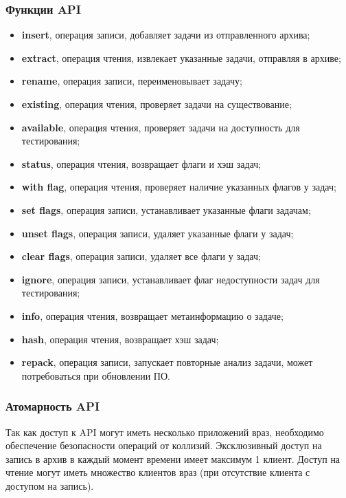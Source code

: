 \subsubsection{Функции API}
\begin{itemize}
    \item \textbf{insert}, операция записи, добавляет задачи из отправленного архива;
    \item \textbf{extract}, операция чтения, извлекает указанные задачи, отправляя в архиве;
    \item \textbf{rename}, операция записи, переименовывает задачу;
    \item \textbf{existing}, операция чтения, проверяет задачи на существование;
    \item \textbf{available}, операция чтения, проверяет задачи на доступность для тестирования;
    \item \textbf{status}, операция чтения, возвращает флаги и хэш задач;
    \item \textbf{with flag}, операция чтения, проверяет наличие указанных флагов у задач;
    \item \textbf{set flags}, операция записи, устанавливает указанные флаги задачам;
    \item \textbf{unset flags}, операция записи, удаляет указанные флаги у задач;
    \item \textbf{clear flags}, операция записи, удаляет все флаги у задач;
    \item \textbf{ignore}, операция записи, устанавливает флаг недоступности задач для тестирования;
    \item \textbf{info}, операция чтения, возвращает метаинформацию о задаче;
    \item \textbf{hash}, операция чтения, возвращает хэш задач;
    \item \textbf{repack}, операция записи, запускает повторные анализ задачи,
        может потребоваться при обновлении ПО.
\end{itemize}

\subsubsection{Атомарность API}
Так как доступ к API могут иметь несколько приложений враз,
необходимо обеспечение безопасности операций от коллизий.
Эксклюзивный доступ на запись в архив в каждый момент времени
имеет максимум 1 клиент. Доступ на чтение могут иметь
множество клиентов враз (при отсутствие клиента
с доступом на запись).

